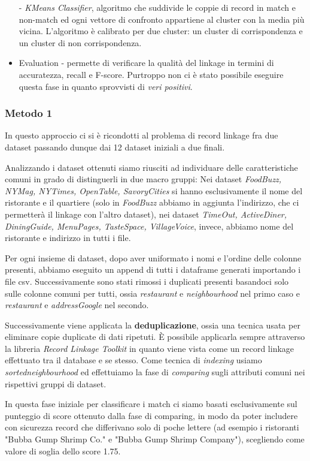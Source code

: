 \documentclass[a4paper,12pt]{article}
\begin{document}
\begin{itemize}
- \textit{KMeans Classifier}, algoritmo che suddivide le coppie di record in match e non-match ed ogni vettore di confronto appartiene al cluster con la media più vicina. L'algoritmo è calibrato per due cluster: un cluster di corrispondenza e un cluster di non corrispondenza.
\item {Evaluation} - permette di verificare la qualità del linkage in termini di accuratezza, recall e F-score. Purtroppo non ci è stato possibile eseguire questa fase in quanto sprovvisti di \textit{veri positivi}.
\end{itemize}


\subsubsection{Metodo 1}
In questo approccio ci si è ricondotti al problema di record linkage fra due dataset passando dunque dai 12 dataset iniziali a due finali.

Analizzando i dataset ottenuti siamo riusciti ad individuare delle caratteristiche comuni in grado di distinguerli in due macro gruppi:
Nei dataset \textit{FoodBuzz, NYMag, NYTimes, OpenTable, SavoryCities} si hanno esclusivamente il nome del ristorante e il quartiere (solo in \textit{FoodBuzz} abbiamo in aggiunta l'indirizzo, che ci permetterà il linkage con l'altro dataset), nei dataset \textit{TimeOut, ActiveDiner, DiningGuide, MenuPages, TasteSpace, VillageVoice}, invece, abbiamo nome del ristorante e indirizzo in tutti i file.

\noindent Per ogni insieme di dataset, dopo aver uniformato i nomi e l'ordine delle colonne presenti, abbiamo eseguito un append di tutti i dataframe generati importando i file csv. 
Successivamente sono stati rimossi i duplicati presenti basandoci solo sulle colonne comuni per tutti, ossia \textit{restaurant} e \textit{neighbourhood} nel primo caso e \textit{restaurant} e \textit{addressGoogle} nel secondo.

\noindent Successivamente viene applicata la \textbf{deduplicazione}, ossia una tecnica usata per eliminare copie duplicate di dati ripetuti. È possibile applicarla sempre attraverso la libreria \textit{Record Linkage Toolkit} in quanto viene vista come un record linkage effettuato tra il database e se stesso. Come tecnica di \textit{indexing} usiamo \textit{sortedneighbourhood} ed effettuiamo la fase di \textit{comparing} sugli attributi comuni nei rispettivi gruppi di dataset.

\noindent In questa fase iniziale per classificare i match ci siamo basati esclusivamente sul punteggio di score ottenuto dalla fase di comparing, in modo da poter includere con sicurezza record che differivano solo di poche lettere (ad esempio i ristoranti "Bubba Gump Shrimp Co." e "Bubba Gump Shrimp Company"), scegliendo come valore di soglia dello score 1.75.
\end{document}
